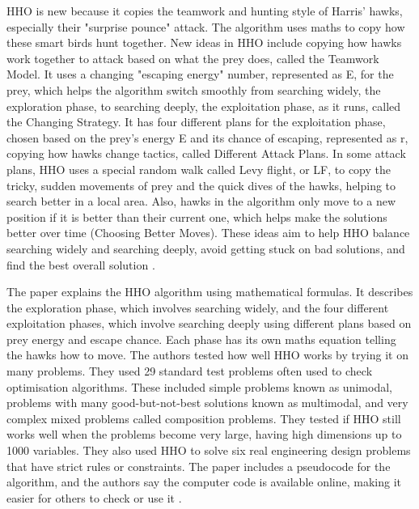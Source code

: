 \documentclass[a4paper, 12pt]{extarticle}
\begin{document}
HHO is new because it copies the teamwork and hunting style of Harris' hawks, especially their "surprise pounce" attack. The algorithm uses maths to copy how these smart birds hunt together. New ideas in HHO include copying how hawks work together to attack based on what the prey does, called the Teamwork Model. It uses a changing "escaping energy" number, represented as E, for the prey, which helps the algorithm switch smoothly from searching widely, the exploration phase, to searching deeply, the exploitation phase, as it runs, called the Changing Strategy. It has four different plans for the exploitation phase, chosen based on the prey's energy E and its chance of escaping, represented as r, copying how hawks change tactics, called Different Attack Plans. In some attack plans, HHO uses a special random walk called Levy flight, or LF, to copy the tricky, sudden movements of prey and the quick dives of the hawks, helping to search better in a local area. Also, hawks in the algorithm only move to a new position if it is better than their current one, which helps make the solutions better over time (Choosing Better Moves). These ideas aim to help HHO balance searching widely and searching deeply, avoid getting stuck on bad solutions, and find the best overall solution \cite{heidari2019harris}.

The paper explains the HHO algorithm using mathematical formulas. It describes the exploration phase, which involves searching widely, and the four different exploitation phases, which involve searching deeply using different plans based on prey energy and escape chance. Each phase has its own maths equation telling the hawks how to move. The authors tested how well HHO works by trying it on many problems. They used 29 standard test problems often used to check optimisation algorithms. These included simple problems known as unimodal, problems with many good-but-not-best solutions known as multimodal, and very complex mixed problems called composition problems. They tested if HHO still works well when the problems become very large, having high dimensions up to 1000 variables. They also used HHO to solve six real engineering design problems that have strict rules or constraints. The paper includes a pseudocode for the algorithm, and the authors say the computer code is available online, making it easier for others to check or use it \cite{heidari2019harris}.
\end{document}

